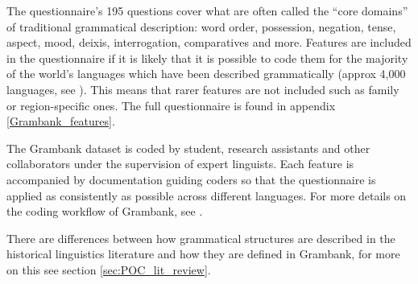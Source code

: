 \documentclass[12pt,letterpaper]{article}
\begin{document}
 


The questionnaire's 195 questions cover what are often called the ``core domains'' of traditional grammatical description: word order, possession, negation, tense, aspect, mood, deixis, interrogation, comparatives and more. Features are included in the questionnaire if it is likely that it is possible to code them for the majority of the world's languages which have been described grammatically (approx 4,000 languages, see \citet{hammarstrom2018simultaneous}). This means that rarer features are not included such as family or region-specific ones. The full questionnaire is found in appendix \ref{Grambank_features}.

The Grambank dataset is coded by student, research assistants and other collaborators under the supervision of expert linguists. Each feature is accompanied by documentation guiding coders so that the questionnaire is applied as consistently as possible across different languages. For more details on the coding workflow of Grambank, see \citet{slingerland2020coding}. %

There are differences between how grammatical structures are described in the historical linguistics literature and how they are defined in Grambank, for more on this see section \ref{sec:POC_lit_review}.
\end{document}
